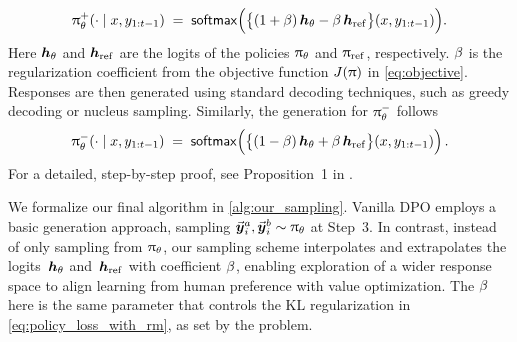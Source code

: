     \begin{align*}
     \uppi_{\theta}^+(\cdot \mid x, y_{1:t-1}) \; = \; {\sf softmax}\Big( \big\{ (1 + \beta) \, \boldsymbol{h}_{\theta} - \beta \, \boldsymbol{h}_{{\rm ref}}\big\} (x, y_{1:t-1}) \Big).
    \end{align*}
Here $ \boldsymbol{h}_{\theta} $ and $ \boldsymbol{h}_{{\rm ref}} $ are the logits of the policies $\uppi_{\theta}$ and $\uppi_{{\rm ref}}$, respectively. $\beta$ is the regularization coefficient from the objective function $ J(\uppi)$ in \cref{eq:objective}. Responses are then generated using standard decoding techniques, such as greedy decoding or nucleus sampling. Similarly, the generation for $\uppi_{\theta}^-$ follows 
\begin{align*}
 \uppi_{\theta}^-(\cdot \mid x, y_{1:t-1}) \; = \; {\sf softmax}\Big( \big\{ (1 - \beta) \, \boldsymbol{h}_{\theta} + \beta \, \boldsymbol{h}_{{\rm ref}}\big\} (x, y_{1:t-1}) \Big) \, .
\end{align*}
For a detailed, step-by-step proof, see Proposition~1 in \citet{liu2024decoding}.

We formalize our final algorithm in \cref{alg:our_sampling}. Vanilla DPO \citep{rafailov2023direct, guo2024direct} employs a basic generation approach, sampling $\vec{\boldsymbol{y}}\!\,^a_i, \vec{\boldsymbol{y}}\!\,^b_i \sim \uppi_{\theta}$ at Step~3. In contrast, instead of only sampling from $\uppi_{\theta}$, our sampling scheme interpolates and extrapolates the logits~$\boldsymbol{h}_{\theta}$ and~$\boldsymbol{h}_{{\rm ref}}$ with coefficient $\beta$, enabling exploration of a wider response space to align learning from human preference with value optimization. The $\beta$ here is the same parameter that controls the KL regularization in \cref{eq:policy_loss_with_rm}, as set by the problem.

